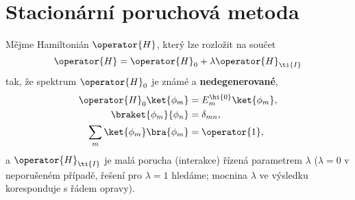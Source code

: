 \section{Stacionární poruchová metoda}
\label{sec:PoruchovaMetoda}
\begin{theory}   
    Mějme Hamiltonián $\operator{H}$, který lze rozložit na součet
    \begin{equation}
        \operator{H}=\operator{H}_{0}+\lambda\operator{H}_{\ti{I}}
    \end{equation}
    tak, že spektrum $\operator{H}_{0}$ je známé a {\bf nedegenerované},
    \begin{subequations}
        \begin{align}
            \operator{H}_{0}\ket{\phi_{m}}&=E_{m}^{\hi{0}}\ket{\phi_{m}},\\
            \braket{\phi_{m}}{\phi_{n}}&=\delta_{mn},\\
            \sum_{m}\ket{\phi_{m}}\bra{\phi_{m}}&=\operator{1},
        \end{align}
    \end{subequations}
    a $\operator{H}_{\ti{I}}$ je malá porucha (interakce) řízená parametrem $\lambda$ 
    ($\lambda=0$ v neporušeném případě, řešení pro $\lambda=1$ hledáme; mocnina $\lambda$ ve výsledku koresponduje s řádem opravy).


\end{theory}
